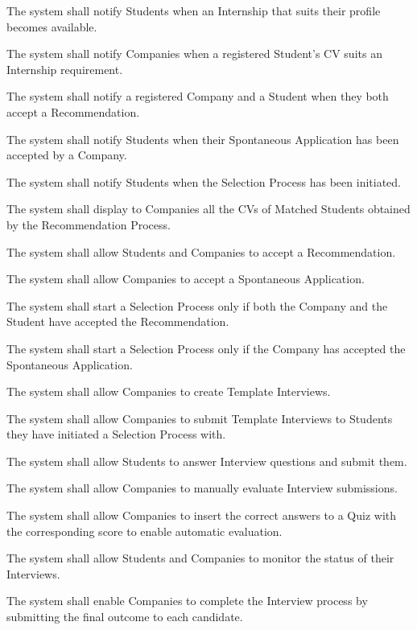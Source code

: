 \begin{enumerate}[label={\color{titleColor}[R\arabic*]}]
    \item The system shall notify Students when an Internship that suits their profile becomes available.
    \item The system shall notify Companies when a registered Student’s CV suits an Internship requirement.
    \item The system shall notify a registered Company and a Student when they both accept a Recommendation.
    \item The system shall notify Students when their Spontaneous Application has been accepted by a Company.
    \item The system shall notify Students when the Selection Process has been initiated.
    \item The system shall display to Companies all the CVs of Matched Students obtained by the Recommendation Process.
    \item The system shall allow Students and Companies to accept a Recommendation.
    \item The system shall allow Companies to accept a Spontaneous Application.
    \item The system shall start a Selection Process only if both the Company and the Student have accepted the Recommendation.
    \item The system shall start a Selection Process only if the Company has accepted the Spontaneous Application.
    
    \item The system shall allow Companies to create Template Interviews.
    \item The system shall allow Companies to submit Template Interviews to Students they have initiated a Selection Process with.
    \item The system shall allow Students to answer Interview questions and submit them.
    \item The system shall allow Companies to manually evaluate Interview submissions.
    \item The system shall allow Companies to insert the correct answers to a Quiz with the corresponding score to enable automatic evaluation.
    \item The system shall allow Students and Companies to monitor the status of their Interviews.
    \item The system shall enable Companies to complete the Interview process by submitting the final outcome to each candidate.
    

\end{enumerate}

